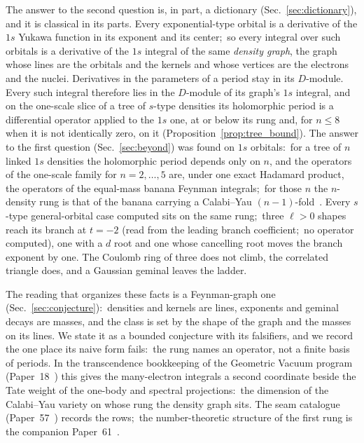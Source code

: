 \documentclass[aps,pra,twocolumn,superscriptaddress,longbibliography]{revtex4-2}
\begin{document}
The answer to the second question is, in part, a dictionary
(Sec.~\ref{sec:dictionary}), and it is classical in its parts.  Every
exponential-type orbital is a derivative of the $1s$ Yukawa function in its
exponent and its center;\ so every integral over such orbitals is a
derivative of the $1s$ integral of the same \emph{density graph}, the graph
whose lines are the orbitals and the kernels and whose vertices are the
electrons and the nuclei.  Derivatives in the parameters of a period stay in
its $D$-module.  Every such integral therefore lies in the $D$-module of its
graph's $1s$ integral, and on the one-scale slice of a tree of $s$-type
densities its holomorphic period is a differential operator applied to the
$1s$ one, at or below its rung and, for $n\le8$ when it is not identically
zero, on it (Proposition~\ref{prop:tree_bound}).  The
answer to the first question (Sec.~\ref{sec:beyond}) was found on $1s$
orbitals:\ for a tree of $n$ linked $1s$ densities the holomorphic period
depends only on $n$, and the operators of the one-scale family for
$n=2,\dots,5$ are, under one exact Hadamard product, the operators of the
equal-mass banana Feynman integrals;\ for those $n$ the $n$-density rung is
that of the banana carrying a Calabi--Yau $(n-1)$-fold~\cite{bonisch2021}.
Every $s$-type general-orbital case computed sits on the same rung;\ three $\ell>0$ shapes reach its branch at $t=-2$ (read from the leading branch coefficient;\ no operator computed), one with a $d$ root and one whose cancelling root moves the branch exponent by one.  The Coulomb ring of three does not climb,
the correlated triangle does, and a Gaussian geminal leaves the ladder.

The reading that organizes these facts is a Feynman-graph one
(Sec.~\ref{sec:conjecture}):\ densities and kernels are lines, exponents and
geminal decays are masses, and the class is set by the shape of the graph and
the masses on its lines.  We state it as a bounded conjecture with its
falsifiers, and we record the one place its naive form fails:\ the rung names
an operator, not a finite basis of periods.  In the transcendence bookkeeping
of the Geometric Vacuum program (Paper~18~\cite{loutey_paper18}) this gives the
many-electron integrals a second coordinate beside the Tate weight of the
one-body and spectral projections:\ the dimension of the Calabi--Yau
variety on whose rung the density graph sits.  The seam catalogue (Paper~57~\cite{loutey_paper57}) records
the rows;\ the number-theoretic structure of the first rung is the companion
Paper~61~\cite{loutey_paper61}.
\end{document}
